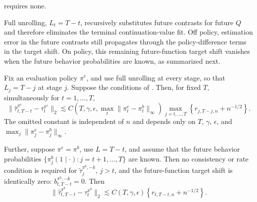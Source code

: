 \documentclass[opre,nonblindrev]{informs4}
\newenvironment{revision}{\begingroup\color{revisionblue}\ignorespaces}{\endgroup}
\newcommand{\norm}[1]{\lVert#1\rVert}
\newcommand{\blipadv}{\tau}
\begin{document}
\begin{revision}
\begin{corollary}
requires none.
\end{corollary}
Full unrolling, $L_t=T-t$, recursively
substitutes future contrasts for future $Q$ and therefore
eliminates the terminal continuation-value fit. Off policy, estimation
error in the future contrasts still propagates through the
policy-difference terms in the target shift. On policy, this remaining
future-function target shift vanishes when the future behavior probabilities
are known, as summarized next.
\begin{corollary}[Reduced future-error dependence when $L=T-t$ and/or $\pi^e = \pi^b$]
\label{cor:full-unrolling-rate}
Fix an evaluation policy $\pi^e$, and use full unrolling at every stage,
so that $L_j=T-j$ at stage $j$. Suppose the conditions of
. Then, for fixed $T$, simultaneously for $t=1,\ldots,T$,
\begin{equation}
\norm{
\hat\blipadv_{t,T-t}^{\pi^e}
-
\blipadv_t^{\pi^e}
}_2
\lesssim
C(
  T,\gamma,\epsilon,
  \max_{t}
  \norm{\pi_t^e-\pi_t^b}_\infty
  )
  \max_{j=t,\ldots,T}
  \left\{r_{j,T-j,n}+n^{-1/2}\right\}.
\label{eq:full-unrolling-rate-propagation}
\end{equation}
The omitted constant is independent of $n$ and depends only on
$T$, $\gamma$, $\epsilon$, and
$\max_j\norm{\pi_j^e-\pi_j^b}_\infty$. 

Further, suppose $\pi^e=\pi^b$, use
$L=T-t$, and assume that the future behavior probabilities
$\{\pi_j^b(1\mid\cdot):j=t+1,\ldots,T\}$ are known. Then no consistency or
rate condition is required for $\widetilde\tau_j^{\pi^b,-k}$, $j>t$, and the
future-function target shift is identically zero: $b_{t,T-t}^{\pi^b,-k}=0$. Then
\begin{equation}
\norm{
\hat\blipadv_{t,T-t}^{\pi^b}
-
\blipadv_t^{\pi^b}
}_2
\lesssim
C(T,\gamma,\epsilon)
\left\{r_{t,T-t,n}+n^{-1/2}\right\}.
\label{eq:on-policy-full-unrolling-rate}
\end{equation}
\end{corollary}
\end{revision}


\end{document}
